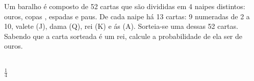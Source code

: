 \begin{ex}
Um baralho é composto de 52 cartas que são divididas em 4 naipes distintos: ouros, copas , espadas e paus. De cada naipe há 13 cartas: 9 numeradas de 2 a 10, valete (J), dama (Q), rei (K) e ás (A). Sorteia-se uma dessas 52 cartas. Sabendo que a carta sorteada é um rei, calcule a probabilidade de ela ser de ouros.
 \begin{sol}
  \phantom{A}\\
  $\frac{1}{4}$
 \end{sol}
\end{ex}